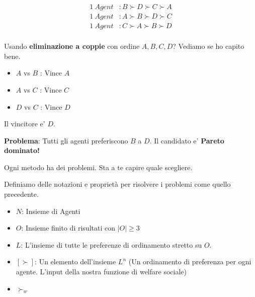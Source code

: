 \begin{equation}
    \begin{aligned}
        1 \ Agent & : B \succ D \succ C \succ A \\
        1 \ Agent & : A \succ B \succ D \succ C \\
        1 \ Agent & : C \succ A \succ B \succ D \\
    \end{aligned}
\end{equation}

Usando \textbf{eliminazione a coppie} con ordine $A,B,C,D$? 
Vediamo se ho capito bene.

\begin{itemize}
    \item $A$ vs $B$ : Vince $A$
    \item $A$ vs $C$ : Vince $C$
    \item $D$ vs $C$ : Vince $D$
\end{itemize}

Il vincitore e' $D$.

\textbf{Problema}: Tutti gli agenti preferiscono $B$ a $D$. Il candidato e' \textbf{Pareto dominato!}

Ogni metodo ha dei problemi. Sta a te capire quale scegliere.

Definiamo delle notazioni e proprietà per risolvere i problemi come quello precedente.

\begin{itemize}
    \item $N$: Insieme di Agenti
    \item $O$: Insieme finito di risultati con $|O| \geq 3$
    \item $L$: L'insieme di tutte le preferenze di ordinamento stretto su $O$.
    \item $[\succ]$: Un elemento dell'insieme $L^n$ (Un ordinamento di preferenza per ogni agente. L'input della nostra funzione di welfare sociale)
    \item $\succ_w$
\end{itemize}
\newpage